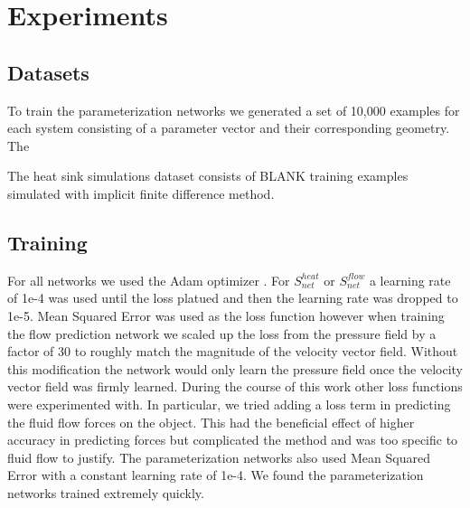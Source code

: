 \documentclass{article} %
\begin{document}
\section{Experiments}


\subsection{Datasets}

To train the parameterization networks we generated a set of 10,000 examples for each system consisting of a parameter vector and their corresponding geometry. The 

The heat sink simulations dataset consists of BLANK training examples simulated with implicit finite difference method.

\subsection{Training}

For all networks we used the Adam optimizer \cite{kingma2014adam}. For $S^{heat}_{net}$ or $S^{flow}_{net}$ a learning rate of 1e-4 was used until the loss platued and then the learning rate was dropped to 1e-5. Mean Squared Error was used as the loss function however when training the flow prediction network we scaled up the loss from the pressure field by a factor of 30 to roughly match the magnitude of the velocity vector field. Without this modification the network would only learn the pressure field once the velocity vector field was firmly learned. During the course of this work other loss functions were experimented with. In particular, we tried adding a loss term in predicting the fluid flow forces on the object. This had the beneficial effect of higher accuracy in predicting forces but complicated the method and was too specific to fluid flow to justify. The parameterization networks also used Mean Squared Error with a constant learning rate of 1e-4. We found the parameterization networks trained extremely quickly.
\end{document}
